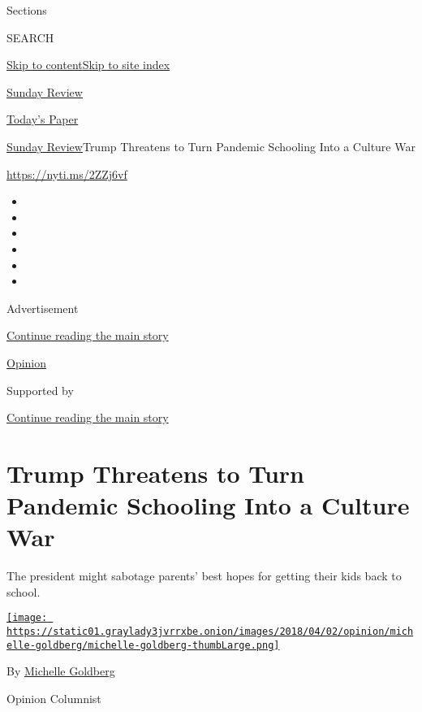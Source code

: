 Sections

SEARCH

\protect\hyperlink{site-content}{Skip to
content}\protect\hyperlink{site-index}{Skip to site index}

\href{https://www.nytimes3xbfgragh.onion/section/opinion/sunday}{Sunday
Review}

\href{https://myaccount.nytimes3xbfgragh.onion/auth/login?response_type=cookie\&client_id=vi}{}

\href{https://www.nytimes3xbfgragh.onion/section/todayspaper}{Today's
Paper}

\href{/section/opinion/sunday}{Sunday Review}\textbar{}Trump Threatens
to Turn Pandemic Schooling Into a Culture War

\url{https://nyti.ms/2ZZj6vf}

\begin{itemize}
\item
\item
\item
\item
\item
\item
\end{itemize}

Advertisement

\protect\hyperlink{after-top}{Continue reading the main story}

\href{/section/opinion}{Opinion}

Supported by

\protect\hyperlink{after-sponsor}{Continue reading the main story}

\hypertarget{trump-threatens-to-turn-pandemic-schooling-into-a-culture-war}{%
\section{Trump Threatens to Turn Pandemic Schooling Into a Culture
War}\label{trump-threatens-to-turn-pandemic-schooling-into-a-culture-war}}

The president might sabotage parents' best hopes for getting their kids
back to school.

\href{https://www.nytimes3xbfgragh.onion/by/michelle-goldberg}{\texttt{[image: https://static01.graylady3jvrrxbe.onion/images/2018/04/02/opinion/michelle-goldberg/michelle-goldberg-thumbLarge.png]}}

By
\href{https://www.nytimes3xbfgragh.onion/by/michelle-goldberg}{Michelle
Goldberg}

Opinion Columnist

